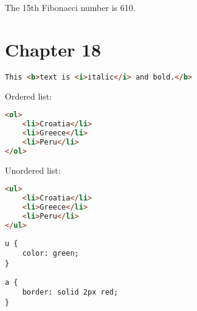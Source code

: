 \documentclass[]{memoir}
\begin{document}
The 15th Fibonacci number is 610.

\section{Chapter 18}


\begin{lstlisting}[language=HTML]
This <b>text is <i>italic</i> and bold.</b>
\end{lstlisting}


Ordered list:

\begin{lstlisting}[language=HTML]
<ol>
    <li>Croatia</li>
    <li>Greece</li>
    <li>Peru</li>
</ol>
\end{lstlisting}

Unordered list:

\begin{lstlisting}[language=HTML]
<ul>
    <li>Croatia</li>
    <li>Greece</li>
    <li>Peru</li>
</ul>
\end{lstlisting}


\begin{lstlisting}
u {
    color: green;
}
\end{lstlisting}


\begin{lstlisting}
a {
    border: solid 2px red;
}
\end{lstlisting}
\end{document}
